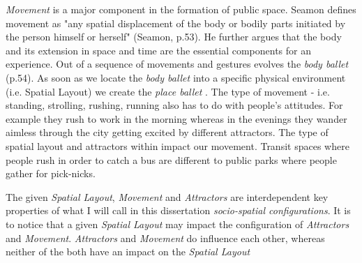 \textit{Movement} is a major component in the formation of public space.
Seamon defines movement as "any spatial displacement of the body or bodily parts initiated by the person himself or herself" (Seamon, p.53). 
He further argues that the body and its extension in space and time are the essential components for an experience. Out of a sequence of movements and gestures evolves the \textit{body ballet}  \cite{Seamon_1979}(p.54). 
As soon as we locate the \textit{body ballet} into a specific physical environment (i.e. Spatial Layout) we create the \textit{place ballet} .
The type of movement - i.e. standing, strolling, rushing, running also has to do with people's attitudes. For example they rush to work in the morning whereas in the evenings they wander aimless through the city getting excited by different attractors.
The type of spatial layout and attractors within impact our movement. Transit spaces where people rush in order to catch a bus are different to public parks where people gather for pick-nicks.

The given \textit{Spatial Layout}, \textit{Movement} and \textit{Attractors} are interdependent key properties of what I will call in this dissertation \textit{socio-spatial configurations}. It is to notice that a given \textit{Spatial Layout} may impact the configuration of \textit{Attractors} and \textit{Movement}. \textit{Attractors} and \textit{Movement} do influence each other, whereas neither of the both have an impact on the \textit{Spatial Layout} 



